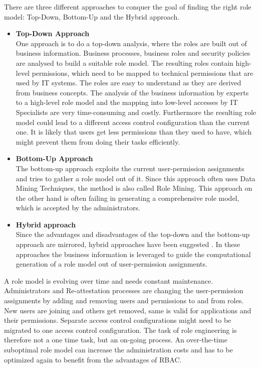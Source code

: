     There are three different approaches to conquer the goal of finding the right role model: Top-Down, Bottom-Up and the Hybrid approach\cite{Coyne:2011}\cite{Frank}.
    \begin{itemize}
        \item \textbf{Top-Down Approach}\\
        One approach is to do a top-down analysis, where the roles are built out of business information. Business processes, business roles and security policies are analysed to build a suitable role model. The resulting roles contain high-level permissions, which need to be mapped to technical permissions that are used by IT systems. The roles are easy to understand as they are derived from business concepts. The analysis of the business information by experts to a high-level role model and the mapping into low-level accesses by IT Specialists are very time-consuming and costly. Furthermore the resulting role model could lead to a different access control configuration than the current one. It is likely that users get less permissions than they used to have, which might prevent them from doing their tasks efficiently.
        
        \item \textbf{Bottom-Up Approach}\\        
        The bottom-up approach exploits the current user-permission assignments and tries to gather a role model out of it. Since this approach often uses Data Mining Techniques, the method is also called Role Mining\cite{Kuhlmann}. This approach on the other hand is often failing in generating a comprehensive role model, which is accepted by the administrators\cite{Frank:2013}.
        
        \item \textbf{Hybrid approach}\\        
        Since the advantages and disadvantages of the top-down and the bottom-up approach are mirrored, hybrid approaches have been suggested \cite{Frank}\cite{6274146}. In these approaches the business information is leveraged to guide the computational generation of a role model out of user-permission assignments.
    \end{itemize}
    A role model is evolving over time and needs constant maintenance\cite{Montrieux:2011}. Administrators and Re-attestation processes are changing the user-permission assignments by adding and removing users and permissions to and from roles. New users are joining and others get removed, same is valid for applications and their permissions. Separate access control configurations might need to be migrated to one access control configuration. The task of role engineering is therefore not a one time task, but an on-going process. An over-the-time suboptimal role model can increase the administration costs and has to be optimized again to benefit from the advantages of RBAC.
    
